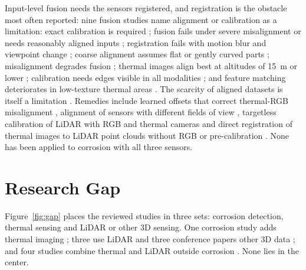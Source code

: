 Input-level fusion needs the sensors registered, and registration is the obstacle
most often reported: nine fusion studies name alignment or calibration as a limitation: exact calibration
is required \citep{Cheng2025}; fusion fails under severe misalignment \citep{Zhu2026} or needs
reasonably aligned inputs \citep{Xu2026}; registration fails with motion blur and
viewpoint change \citep{Bin2023}; coarse alignment assumes flat or gently curved parts
\citep{Li2024c}; misalignment degrades fusion \citep{Cao2026}; thermal images align best at
altitudes of 15~m or lower \citep{Nooralishahi2022}; calibration needs edges visible in all
modalities \citep{Yang2024}; and feature matching deteriorates in low-texture thermal areas
\citep{Zhu2026a}. The scarcity of aligned datasets is itself a limitation \citep{Hou2024}. Remedies include learned
offsets that correct thermal-RGB misalignment \citep{Liu2025}, alignment of sensors with
different fields of view \citep{Shahsavarani2024}, targetless calibration of LiDAR with RGB and
thermal cameras \citep{Tran2024,Yang2024} and direct registration of thermal images to LiDAR
point clouds without RGB or pre-calibration \citep{Zhu2026a}. None has been applied to
corrosion with all three sensors.

\section{Research Gap}
\label{sec:lr-gap}

Figure~\ref{fig:gap} places the reviewed studies in three sets: corrosion
detection, thermal sensing and LiDAR or other 3D sensing. One corrosion study
adds thermal imaging \citep{Lim2021}; three use LiDAR
\citep{Maru2025,PimenteldeFigueiredo2025,PallasEnguita2025} and three conference
papers other 3D data \citep{Ding2025,Zheng2025,Haitz2022}; and four studies
combine thermal and LiDAR outside corrosion
\citep{Tran2025,Tran2024,Yang2024,Zhu2026a}. None lies in the center.

